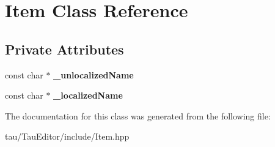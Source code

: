 \hypertarget{class_item}{}\section{Item Class Reference}
\label{class_item}
\subsection*{Private Attributes}
\begin{DoxyCompactItemize}
\item 
\mbox{\label{class_item_a60e04b77db4bdd6b7f7095c1186f8163}} 
const char $\ast$ {\bfseries \+\_\+unlocalized\+Name}
\item 
\mbox{\label{class_item_a48ebca69f9093a000ff5bdfc0a7086be}} 
const char $\ast$ {\bfseries \+\_\+localized\+Name}
\end{DoxyCompactItemize}


The documentation for this class was generated from the following file\+:\begin{DoxyCompactItemize}
\item 
tau/\+Tau\+Editor/include/Item.\+hpp\end{DoxyCompactItemize}
